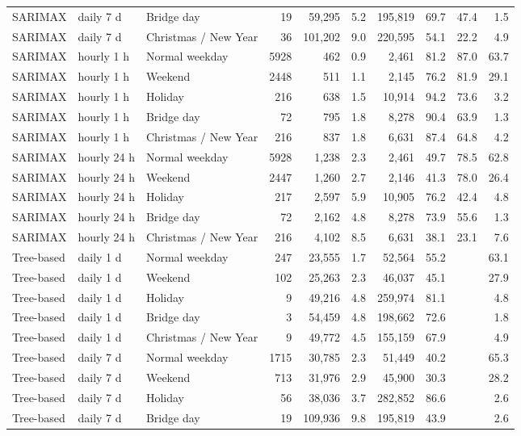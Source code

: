 \begin{tabular}{lllrrrrrrr}
SARIMAX & daily 7 d & Bridge day & 19 & 59,295 & 5.2 & 195,819 & 69.7 & 47.4 & 1.5 \\
SARIMAX & daily 7 d & Christmas / New Year & 36 & 101,202 & 9.0 & 220,595 & 54.1 & 22.2 & 4.9 \\
SARIMAX & hourly 1 h & Normal weekday & 5928 & 462 & 0.9 & 2,461 & 81.2 & 87.0 & 63.7 \\
SARIMAX & hourly 1 h & Weekend & 2448 & 511 & 1.1 & 2,145 & 76.2 & 81.9 & 29.1 \\
SARIMAX & hourly 1 h & Holiday & 216 & 638 & 1.5 & 10,914 & 94.2 & 73.6 & 3.2 \\
SARIMAX & hourly 1 h & Bridge day & 72 & 795 & 1.8 & 8,278 & 90.4 & 63.9 & 1.3 \\
SARIMAX & hourly 1 h & Christmas / New Year & 216 & 837 & 1.8 & 6,631 & 87.4 & 64.8 & 4.2 \\
SARIMAX & hourly 24 h & Normal weekday & 5928 & 1,238 & 2.3 & 2,461 & 49.7 & 78.5 & 62.8 \\
SARIMAX & hourly 24 h & Weekend & 2447 & 1,260 & 2.7 & 2,146 & 41.3 & 78.0 & 26.4 \\
SARIMAX & hourly 24 h & Holiday & 217 & 2,597 & 5.9 & 10,905 & 76.2 & 42.4 & 4.8 \\
SARIMAX & hourly 24 h & Bridge day & 72 & 2,162 & 4.8 & 8,278 & 73.9 & 55.6 & 1.3 \\
SARIMAX & hourly 24 h & Christmas / New Year & 216 & 4,102 & 8.5 & 6,631 & 38.1 & 23.1 & 7.6 \\
Tree-based & daily 1 d & Normal weekday & 247 & 23,555 & 1.7 & 52,564 & 55.2 &  & 63.1 \\
Tree-based & daily 1 d & Weekend & 102 & 25,263 & 2.3 & 46,037 & 45.1 &  & 27.9 \\
Tree-based & daily 1 d & Holiday & 9 & 49,216 & 4.8 & 259,974 & 81.1 &  & 4.8 \\
Tree-based & daily 1 d & Bridge day & 3 & 54,459 & 4.8 & 198,662 & 72.6 &  & 1.8 \\
Tree-based & daily 1 d & Christmas / New Year & 9 & 49,772 & 4.5 & 155,159 & 67.9 &  & 4.9 \\
Tree-based & daily 7 d & Normal weekday & 1715 & 30,785 & 2.3 & 51,449 & 40.2 &  & 65.3 \\
Tree-based & daily 7 d & Weekend & 713 & 31,976 & 2.9 & 45,900 & 30.3 &  & 28.2 \\
Tree-based & daily 7 d & Holiday & 56 & 38,036 & 3.7 & 282,852 & 86.6 &  & 2.6 \\
Tree-based & daily 7 d & Bridge day & 19 & 109,936 & 9.8 & 195,819 & 43.9 &  & 2.6 \\

\end{tabular}
